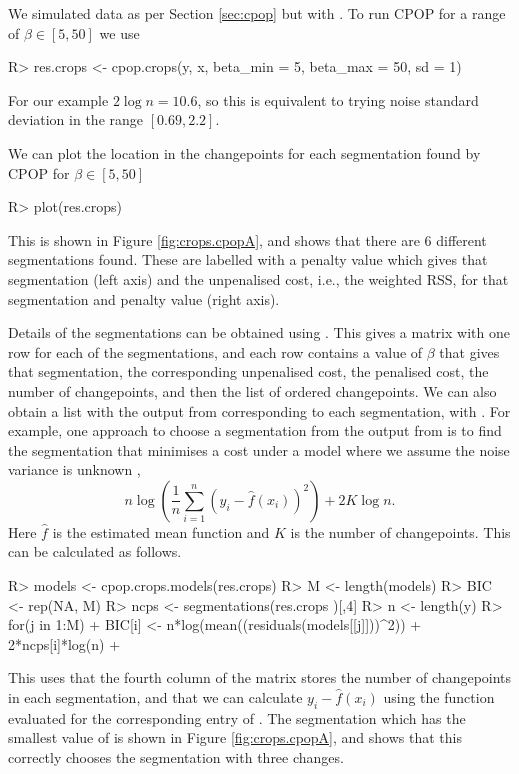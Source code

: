 \documentclass[article]{jss}
\begin{document}
We simulated data as per Section \ref{sec:cpop} but with . To run CPOP for a range of $\beta\in[5, 50]$ we use
\begin{CodeInput}
R> res.crops <- cpop.crops(y, x, beta_min = 5, beta_max = 50, sd = 1)
\end{CodeInput}
For our example $2 \log n = 10.6$, so this is equivalent to trying noise standard deviation in the range $[0.69,2.2]$. 

We can plot the location in the changepoints for each segmentation found by CPOP for $\beta\in[5,50]$
\begin{CodeInput}
R> plot(res.crops)
\end{CodeInput}
This is shown in Figure \ref{fig:crops.cpopA}, and shows that there are 6 different segmentations found. These are labelled with a penalty value which gives that segmentation (left axis) and the unpenalised cost, i.e., the weighted RSS, for that segmentation and penalty value (right axis).

Details of the segmentations can be obtained using . This gives a matrix with one row for each of the segmentations, and each row contains a value of $\beta$ that gives that segmentation, the corresponding unpenalised cost, the penalised cost, the number of changepoints, and then the list of ordered changepoints. 
%
%
We can also obtain a list with the output from  corresponding to each segmentation, with . For example, one approach to choose a segmentation from the output from  is to find the segmentation that minimises a cost under a model where we assume the noise variance is unknown \citep{fryzlewicz2014wild},
\[
 n \log \left( \frac{1}{n} \sum_{i=1}^n \left(y_i-\hat{f}(x_i)\right)^2
\right) + 2 K \log n.
\]
Here $\hat{f}$ is the estimated mean function and $K$ is the number of changepoints. This can be calculated as follows.
\begin{CodeChunk}
\begin{CodeInput}
R> models <- cpop.crops.models(res.crops)
R> M <- length(models)
R> BIC <- rep(NA, M)
R> ncps <- segmentations(res.crops )[,4]
R> n <- length(y)
R> for(j in 1:M) {
+   BIC[i] <- n*log(mean((residuals(models[[j]]))^2)) + 2*ncps[i]*log(n)
+ }
\end{CodeInput}
\end{CodeChunk}
This uses that the fourth column of the matrix  stores the number of changepoints in each segmentation, and that we can calculate $y_i - \hat{f}(x_i)$ using the  function evaluated for the corresponding entry of . The segmentation which has the smallest value of  is shown in Figure \ref{fig:crops.cpopA}, and shows that this correctly chooses the segmentation with three changes.
\end{document}
